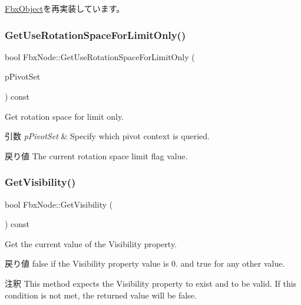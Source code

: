 \hyperlink{class_fbx_object_a817dcfa8f7f7e2437324e1e71377c4b2}{Fbx\+Object}を再実装しています。

\mbox{\label{class_fbx_node_a1d248029e83c952293b0be6f4474e59d}} 
\subsubsection{\texorpdfstring{Get\+Use\+Rotation\+Space\+For\+Limit\+Only()}{GetUseRotationSpaceForLimitOnly()}}
{\footnotesize\ttfamily bool Fbx\+Node\+::\+Get\+Use\+Rotation\+Space\+For\+Limit\+Only (\begin{DoxyParamCaption}\item[{\hyperlink{class_fbx_node_ae62b7311ac4727654cdf1ebd5cbf7343}{E\+Pivot\+Set}}]{p\+Pivot\+Set }\end{DoxyParamCaption}) const}

Get rotation space for limit only. 
\begin{DoxyParams}{引数}
{\em p\+Pivot\+Set} & Specify which pivot context is queried. \\
\hline
\end{DoxyParams}
\begin{DoxyReturn}{戻り値}
The current rotation space limit flag value. 
\end{DoxyReturn}
\mbox{\label{class_fbx_node_a5c3884c6558fcf5c3078d00dc6887e2c}} 
\subsubsection{\texorpdfstring{Get\+Visibility()}{GetVisibility()}}
{\footnotesize\ttfamily bool Fbx\+Node\+::\+Get\+Visibility (\begin{DoxyParamCaption}{ }\end{DoxyParamCaption}) const}

Get the current value of the Visibility property. \begin{DoxyReturn}{戻り値}
{\ttfamily false} if the Visibility property value is 0. and {\ttfamily true} for any other value. 
\end{DoxyReturn}
\begin{DoxyRemark}{注釈}
This method expects the Visibility property to exist and to be valid. If this condition is not met, the returned value will be {\ttfamily false}. 
\end{DoxyRemark}
\mbox{\label{class_fbx_node_aa7c5504f8f25c706e609b185fd299e34}} 
